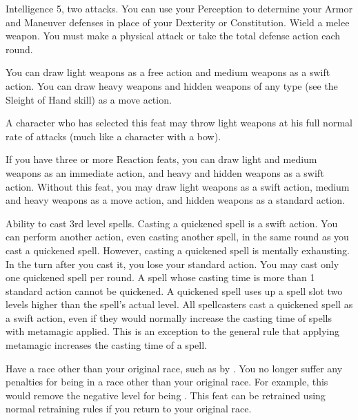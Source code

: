 \featpres Intelligence 5, two attacks.
\featben You can use your Perception to determine your Armor and Maneuver defenses in place of your Dexterity or Constitution.
\stylereq Wield a melee weapon.
You must make a physical attack or take the total defense action each round.

\featben You can draw light weapons as a free action and medium weapons as a swift action.
You can draw heavy weapons and hidden weapons of any type (see the Sleight of Hand skill) as a move action.
\par A character who has selected this feat may throw light weapons at his full normal rate of attacks (much like a character with a bow).

If you have three or more Reaction feats, you can draw light and medium weapons as an immediate action, and heavy and hidden weapons as a swift action.
Without this feat, you may draw light weapons as a swift action, medium and heavy weapons as a move action, and hidden weapons as a standard action.

\label{Quicken Spell}
\featpre Ability to cast 3rd level spells.
\featben Casting a quickened spell is a swift action.
You can perform another action, even casting another spell, in the same round as you cast a quickened spell.
However, casting a quickened spell is mentally exhausting.
In the turn after you cast it, you lose your standard action.
You may cast only one quickened spell per round.
A spell whose casting time is more than 1 standard action cannot be quickened.
A quickened spell uses up a spell slot two levels higher than the spell's actual level.
All spellcasters cast a quickened spell as a swift action, even if they would normally increase the casting time of spells with metamagic applied.
This is an exception to the general rule that applying metamagic increases the casting time of a spell.

\label{Racial Acclimation}
\featpre Have a race other than your original race, such as by .
\featben You no longer suffer any penalties for being in a race other than your original race.
For example, this would remove the negative level for being .
This feat can be retrained using normal retraining rules if you return to your original race.

